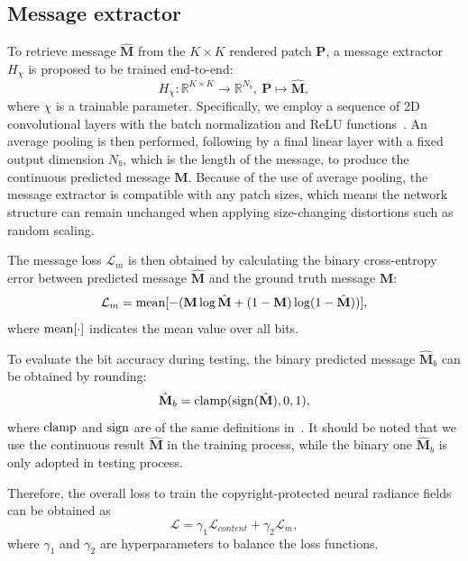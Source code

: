 \documentclass[10pt,twocolumn,letterpaper]{article}
\def\M{{\mathbf{M}}}
\begin{document}
\subsection{Message extractor}
To retrieve message $\hat{\M}$ from the $K \times K$ rendered patch $\mathbf{P}$, a message extractor $H_{\chi}$ is proposed to be trained end-to-end:
\begin{equation}
H_{\chi}: \mathbb{R}^{K \times K}\rightarrow \mathbb{R}^{N_b},\ \mathbf{P} \mapsto \hat{\M},
\end{equation}
where $\chi$ is a trainable parameter. 
Specifically, we employ a sequence of 2D convolutional layers with the batch normalization and ReLU functions~\cite{ioffe2015batch}. An average pooling is then performed, following by a ﬁnal linear layer with a fixed output dimension $N_b$, which is the length of the message, to produce the continuous predicted message $\hat{\M}$. Because of the use of average pooling, the message extractor is compatible with any patch sizes, which means the network structure can remain unchanged when applying size-changing distortions such as random scaling.

The message loss $\mathcal{L}_m$ is then obtained by calculating the binary cross-entropy error between predicted message $\hat{\mathbf{M}}$ and the ground truth message $\mathbf{M}$:
\begin{equation}
  \mathcal{L}_m = {\rm mean}[-(\mathbf{M} \log \hat{\mathbf{M}}+(1-\mathbf{M}) \log (1-\hat{\mathbf{M}}))],
\end{equation}
where ${\rm mean}[\cdot]$ indicates the mean value over all bits.

To evaluate the bit accuracy during testing, the binary predicted message $\hat{\mathbf{M}}_b$ can be obtained by rounding:
\begin{equation}
\hat{\mathbf{M}}_b =  {\rm clamp}({\rm sign}(\hat{\mathbf{M}}), 0, 1),
\end{equation}
where $\rm clamp$ and $\rm sign$ are of the same definitions in~\cite{Yoo_2022_CVPR}. It should be noted that we use the continuous result $\hat{\mathbf{M}}$ in the training process, while the binary one $\hat{\mathbf{M}}_b$ is only adopted in testing process.

Therefore, the overall loss to train the copyright-protected neural radiance fields can be obtained as
\begin{equation}
\mathcal{L} = \gamma_1\mathcal{L}_{content} + \gamma_2\mathcal{L}_m,
\label{eq:loss}
\end{equation}
where $\gamma_1$ and $\gamma_2$ are hyperparameters to balance the loss functions.
\end{document}
